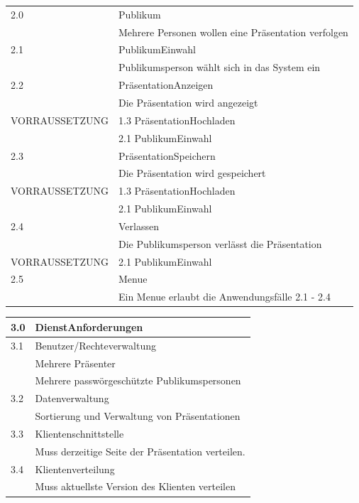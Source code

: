 \begin{tabularx}{\textwidth}[!htb]{|l|X|}
	\hline
	2.0 & Publikum\\
	& Mehrere Personen wollen eine Präsentation verfolgen\\
	\hline
	\hline
	2.1 & PublikumEinwahl\\
	& Publikumsperson wählt sich in das System ein\\
	\hline
	\hline
	2.2 & PräsentationAnzeigen\\
	& Die Präsentation wird angezeigt\\
	VORRAUSSETZUNG & 1.3 PräsentationHochladen\\
	& 2.1 PublikumEinwahl\\
	\hline
	\hline
	2.3 & PräsentationSpeichern\\
	& Die Präsentation wird gespeichert\\
	VORRAUSSETZUNG & 1.3 PräsentationHochladen\\
	& 2.1 PublikumEinwahl\\
	\hline
	\hline
	2.4 & Verlassen\\
	& Die Publikumsperson verlässt die Präsentation\\
	VORRAUSSETZUNG & 2.1 PublikumEinwahl\\
	\hline
	\hline
	2.5 & Menue\\
	& Ein Menue erlaubt die Anwendungsfälle 2.1 - 2.4\\
	\hline
\end{tabularx}

\begin{tabularx}{\textwidth}[!htb]{|l|X|}
	\hline
	3.0 & DienstAnforderungen\\
	\hline
	\hline
	3.1 & Benutzer/Rechteverwaltung\\
	& Mehrere Präsenter\\
	& Mehrere passwörgeschützte Publikumspersonen\\
	\hline
	\hline
	3.2 & Datenverwaltung\\
	& Sortierung und Verwaltung von Präsentationen\\
	\hline
	\hline
	3.3 & Klientenschnittstelle\\
	& Muss derzeitige Seite der Präsentation verteilen.\\
	\hline
	\hline
	3.4 & Klientenverteilung\\
	& Muss aktuellste Version des Klienten verteilen\\
	\hline
\end{tabularx}


